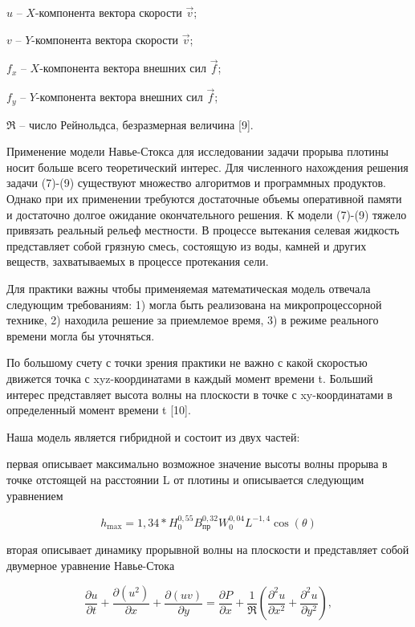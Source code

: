\begin{multicols}{2}
\(u\) -- \(X\)-компонента вектора скорости \(\overrightarrow{v}\);

\(v\) -- \(Y\)-компонента вектора скорости \(\overrightarrow{v}\);

\(f_{x}\) -- \(X\)-компонента вектора внешних сил
\(\overrightarrow{f}\);

\(f_{y}\) -- \(Y\)-компонента вектора внешних сил
\(\overrightarrow{f}\);

\(\Re\) -- число Рейнольдса, безразмерная величина {[}9{]}.

Применение модели Навье-Стокса для исследовании задачи прорыва плотины
носит больше всего теоретический интерес. Для численного нахождения
решения задачи (7)-(9) существуют множество алгоритмов и программных
продуктов. Однако при их применении требуются достаточные объемы
оперативной памяти и достаточно долгое ожидание окончательного решения.
К модели (7)-(9) тяжело привязать реальный рельеф местности. В процессе
вытекания селевая жидкость представляет собой грязную смесь, состоящую
из воды, камней и других веществ, захватываемых в процессе протекания
сели.

Для практики важны чтобы применяемая математическая модель отвечала
следующим требованиям: 1) могла быть реализована на микропроцессорной
технике, 2) находила решение за приемлемое время, 3) в режиме реального
времени могла бы уточняться.

По большому счету с точки зрения практики не важно с какой скоростью
движется точка с xyz-координатами в каждый момент времени t. Больший
интерес представляет высота волны на плоскости в точке с xy-координатами
в определенный момент времени t {[}10{]}.

Наша модель является гибридной и состоит из двух частей:

первая описывает максимально возможное значение высоты волны прорыва в
точке отстоящей на расстоянии L от плотины и описывается следующим
уравнением
\end{multicols}

\begin{equation}
h_{\max} = 1,34*H_{0}^{0,55}B_{пр}^{0,32}W_{0}^{0,04}L^{- 1,4}\cos(\theta)
\end{equation}

вторая описывает динамику прорывной волны на плоскости и представляет
собой двумерное уравнение Навье-Стока

\begin{equation}
\frac{\partial u}{\partial t} + \frac{\partial(u^{2})}{\partial x} + \frac{\partial(uv)}{\partial y} = \frac{\partial P}{\partial x} + \frac{1}{\Re}\left( \frac{\partial^{2}u}{\partial x^{2}} + \frac{\partial^{2}u}{\partial y^{2}} \right),
\end{equation}

